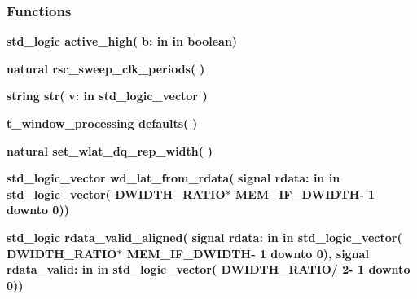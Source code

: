 \subsubsection*{Functions}
 \begin{DoxyCompactItemize}
\item 
{\bfseries {\bfseries \textcolor{comment}{std\+\_\+logic}\textcolor{vhdlchar}{ }}} {\bf active\+\_\+high}{\bfseries  ( }{\bfseries \textcolor{vhdlchar}{b\+: }\textcolor{stringliteral}{in }\textcolor{vhdlchar}{in boolean}}{\bfseries  )} 
\item 
{\bfseries {\bfseries \textcolor{comment}{natural}\textcolor{vhdlchar}{ }}} {\bf rsc\+\_\+sweep\+\_\+clk\+\_\+periods}{\bfseries  ( }{\bfseries  )} 
\item 
{\bfseries {\bfseries \textcolor{comment}{string}\textcolor{vhdlchar}{ }}} {\bf str}{\bfseries  ( }{\bfseries \textcolor{vhdlchar}{v\+: }\textcolor{stringliteral}{in }{\bfseries \textcolor{comment}{std\+\_\+logic\+\_\+vector}\textcolor{vhdlchar}{ }}}{\bfseries  )} 
\item 
{\bfseries {\bfseries {\bfseries {\bf t\+\_\+window\+\_\+processing}} \textcolor{vhdlchar}{ }}} {\bf defaults}{\bfseries  ( }{\bfseries  )} 
\item 
{\bfseries {\bfseries \textcolor{comment}{natural}\textcolor{vhdlchar}{ }}} {\bf set\+\_\+wlat\+\_\+dq\+\_\+rep\+\_\+width}{\bfseries  ( }{\bfseries  )} 
\item 
{\bfseries {\bfseries \textcolor{comment}{std\+\_\+logic\+\_\+vector}\textcolor{vhdlchar}{ }}} {\bf wd\+\_\+lat\+\_\+from\+\_\+rdata}{\bfseries  ( }{\bfseries {\bfseries \textcolor{keywordflow}{signal}\textcolor{vhdlchar}{ }}\textcolor{vhdlchar}{rdata\+: }\textcolor{stringliteral}{in }\textcolor{vhdlchar}{in std\+\_\+logic\+\_\+vector(   D\+W\+I\+D\+T\+H\+\_\+\+R\+A\+T\+I\+O$\ast$   M\+E\+M\+\_\+\+I\+F\+\_\+\+D\+W\+I\+D\+T\+H-\/ 1 downto  0)}}{\bfseries  )} 
\item 
{\bfseries {\bfseries \textcolor{comment}{std\+\_\+logic}\textcolor{vhdlchar}{ }}} {\bf rdata\+\_\+valid\+\_\+aligned}{\bfseries  ( }{\bfseries {\bfseries \textcolor{keywordflow}{signal}\textcolor{vhdlchar}{ }}\textcolor{vhdlchar}{rdata\+: }\textcolor{stringliteral}{in }\textcolor{vhdlchar}{in std\+\_\+logic\+\_\+vector(   D\+W\+I\+D\+T\+H\+\_\+\+R\+A\+T\+I\+O$\ast$   M\+E\+M\+\_\+\+I\+F\+\_\+\+D\+W\+I\+D\+T\+H-\/ 1 downto  0)}}{\bfseries  , {\bfseries \textcolor{keywordflow}{signal}\textcolor{vhdlchar}{ }}\textcolor{vhdlchar}{rdata\+\_\+valid\+: }\textcolor{stringliteral}{in }\textcolor{vhdlchar}{in std\+\_\+logic\+\_\+vector(   D\+W\+I\+D\+T\+H\+\_\+\+R\+A\+T\+I\+O/ 2-\/ 1 downto  0)}}{\bfseries  )} 

\end{DoxyCompactItemize}
